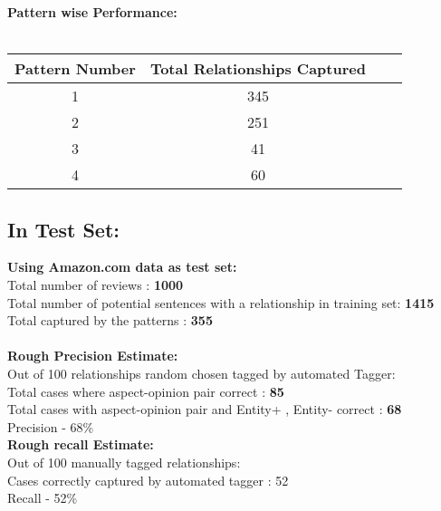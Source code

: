 \documentclass[12pt]{article}
\begin{document}
\noindent
\textbf{Pattern wise Performance:}\\\\
\begin{tabular}{ | c || c | c | r |  }
\hline			
  Pattern Number & Total Relationships Captured \\ \hline
  1 & 345 \\ \hline
  2 & 251\\ \hline
  3 & 41 \\ \hline
  4 & 60 \\ \hline
\end{tabular}

\subsection{In Test Set:}
\textbf{Using Amazon.com data as test set:}\\
Total number of reviews  : \textbf{1000}\\
Total number of potential sentences with a relationship in training set: \textbf{ 1415}\\
Total captured by the patterns : \textbf{355}\\\\
\textbf{Rough Precision Estimate:} \\
Out of 100 relationships random chosen tagged by automated Tagger: \\
Total cases where aspect-opinion pair correct : \textbf{85} \\
Total cases with aspect-opinion pair and  Entity+ , Entity- correct : \textbf{68} \\
Precision - 68\% \\

\noindent
\textbf{Rough recall Estimate:}\\
Out of 100 manually tagged relationships:\\
Cases correctly captured by automated tagger : 52\\
Recall - 52\%
\end{document}
